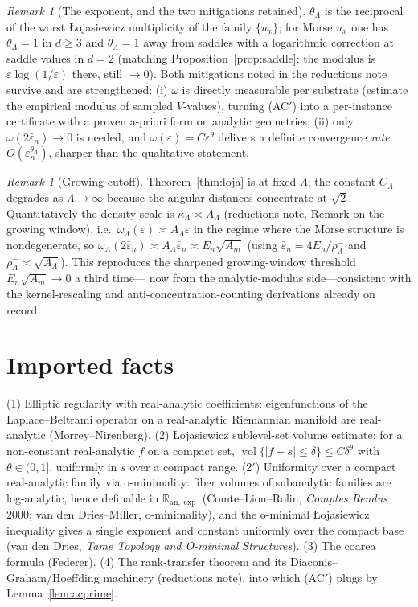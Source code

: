 \documentclass[11pt]{article}
\theoremstyle{remark}
\newtheorem{remark}[theorem]{Remark}
\newcommand{\vol}{\operatorname{vol}}
\begin{document}
\begin{remark}[The exponent, and the two mitigations retained]
$\theta_\Lambda$ is the reciprocal of the worst \L ojasiewicz multiplicity of the family
$\{u_x\}$; for Morse $u_x$ one has $\theta_\Lambda=1$ in $d\ge3$ and $\theta_\Lambda=1$
away from saddles with a logarithmic correction at saddle values in $d=2$ (matching
Proposition~\ref{prop:saddle}: the modulus is $\varepsilon\log(1/\varepsilon)$ there, still
$\to0$). Both mitigations noted in the reductions note survive and are strengthened: (i)
$\omega$ is directly measurable per substrate (estimate the empirical modulus of sampled
$V$-values), turning (AC$'$) into a per-instance certificate with a proven a-priori form on
analytic geometries; (ii) only $\omega(2\bar\varepsilon_n)\to0$ is needed, and
$\omega(\varepsilon)=C\varepsilon^{\theta}$ delivers a definite convergence \emph{rate}
$O(\bar\varepsilon_n^{\theta_\Lambda})$, sharper than the qualitative statement.
\end{remark}

\begin{remark}[Growing cutoff]
Theorem~\ref{thm:loja} is at fixed $\Lambda$; the constant $C_\Lambda$ degrades as
$\Lambda\to\infty$ because the angular distances concentrate at $\sqrt2$. Quantitatively
the density scale is $\kappa_\Lambda\asymp A_\Lambda$ (reductions note, Remark on the
growing window), i.e.\ $\omega_\Lambda(\varepsilon)\asymp A_\Lambda\varepsilon$ in the
regime where the Morse structure is nondegenerate, so
$\omega_\Lambda(2\bar\varepsilon_n)\asymp A_\Lambda\bar\varepsilon_n\asymp E_n\sqrt{A_m}$
(using $\bar\varepsilon_n=4E_n/\rho^-_\Lambda$ and $\rho^-_\Lambda\asymp\sqrt{A_\Lambda}$).
This reproduces the sharpened growing-window threshold $E_n\sqrt{A_m}\to0$ a third time---%
now from the analytic-modulus side---consistent with the kernel-rescaling and
anti-concentration-counting derivations already on record.
\end{remark}

\section{Imported facts}
(1) Elliptic regularity with real-analytic coefficients: eigenfunctions of the
Laplace--Beltrami operator on a real-analytic Riemannian manifold are real-analytic
(Morrey--Nirenberg). (2) \L ojasiewicz sublevel-set volume estimate: for a non-constant
real-analytic $f$ on a compact set, $\vol\{\lvert f-s\rvert\le\delta\}\le C\delta^\theta$
with $\theta\in(0,1]$, uniformly in $s$ over a compact range. (2$'$) Uniformity over a
compact real-analytic family via o-minimality: fiber volumes of subanalytic families are
log-analytic, hence definable in $\mathbb R_{\mathrm{an},\exp}$ (Comte--Lion--Rolin, \emph{Comptes
Rendus} 2000; van den Dries--Miller, o-minimality), and the o-minimal \L ojasiewicz
inequality gives a single exponent and constant uniformly over the compact base
(van den Dries, \emph{Tame Topology and O-minimal Structures}). (3) The
coarea formula (Federer). (4) The rank-transfer theorem and its Diaconis--Graham/Hoeffding
machinery (reductions note), into which (AC$'$) plugs by Lemma~\ref{lem:acprime}.
\end{document}
